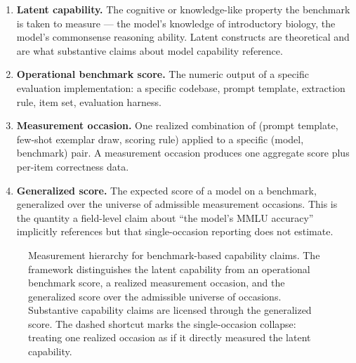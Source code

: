 \documentclass[11pt]{article}
\begin{document}
\begin{enumerate}
  \item \textbf{Latent capability.} The cognitive or knowledge-like property the benchmark is taken to measure --- the model's knowledge of introductory biology, the model's commonsense reasoning ability. Latent constructs are theoretical and are what substantive claims about model capability reference.

  \item \textbf{Operational benchmark score.} The numeric output of a specific evaluation implementation: a specific codebase, prompt template, extraction rule, item set, evaluation harness.

  \item \textbf{Measurement occasion.} One realized combination of (prompt template, few-shot exemplar draw, scoring rule) applied to a specific (model, benchmark) pair. A measurement occasion produces one aggregate score plus per-item correctness data.

  \item \textbf{Generalized score.} The expected score of a model on a benchmark, generalized over the universe of admissible measurement occasions. This is the quantity a field-level claim about ``the model's MMLU accuracy'' implicitly references but that single-occasion reporting does not estimate.
\end{enumerate}

\begin{figure}[h]
\centering
{}
\caption{Measurement hierarchy for benchmark-based capability claims. The framework distinguishes the latent capability from an operational benchmark score, a realized measurement occasion, and the generalized score over the admissible universe of occasions. Substantive capability claims are licensed through the generalized score. The dashed shortcut marks the single-occasion collapse: treating one realized occasion as if it directly measured the latent capability.}
\label{fig:measurement-hierarchy}
\end{figure}
\end{document}
